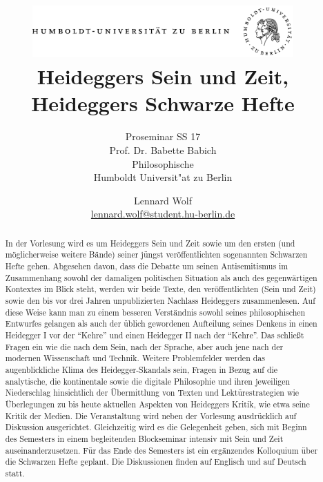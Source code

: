 \documentclass[emulatestandardclasses]{scrartcl}
\date{\vspace{-3ex}}
\begin{document}
\title{
	\includegraphics*[width=0.75\textwidth]{ErstesSem/images/hu_logo.png}\\
	\vspace{24pt}
	Heideggers Sein und Zeit, Heideggers Schwarze Hefte}
\subtitle{Proseminar SS 17\\
          Prof. Dr. Babette Babich\\
          Philosophische  \\ 
          Humboldt Universit"at zu Berlin}
\author{Lennard Wolf\\
        \small{\href{mailto:lennard.wolf@student.hu-berlin.de}{lennard.wolf@student.hu-berlin.de}}}
\maketitle
\begin{abstract}

In der Vorlesung wird es um Heideggers Sein und Zeit sowie um den ersten (und möglicherweise weitere Bände) seiner jüngst veröffentlichten sogenannten Schwarzen Hefte gehen. Abgesehen davon, dass die Debatte um seinen Antisemitismus im Zusammenhang sowohl der damaligen politischen Situation als auch des gegenwärtigen Kontextes im Blick steht, werden wir beide Texte, den veröffentlichten (Sein und Zeit) sowie den bis vor drei Jahren unpublizierten Nachlass Heideggers zusammenlesen. Auf diese Weise kann man zu einem besseren Verständnis sowohl seines philosophischen Entwurfes gelangen als auch der üblich gewordenen Aufteilung seines Denkens in einen Heidegger I vor der “Kehre” und einen Heidegger II nach der “Kehre”. Das schließt Fragen ein wie die nach dem Sein, nach der Sprache, aber auch jene nach der modernen Wissenschaft und Technik. Weitere Problemfelder werden das augenblickliche Klima des Heidegger-Skandals sein, Fragen in Bezug auf die analytische, die kontinentale sowie die digitale Philosophie und ihren jeweiligen Niederschlag hinsichtlich der Übermittlung von Texten und Lektürestrategien wie Überlegungen zu bis heute aktuellen Aspekten von Heideggers Kritik, wie etwa seine Kritik der Medien.
Die Veranstaltung wird neben der Vorlesung ausdrücklich auf Diskussion ausgerichtet. Gleichzeitig wird es die Gelegenheit geben, sich mit Beginn des Semesters in einem begleitenden Blockseminar intensiv mit Sein und Zeit auseinanderzusetzen. Für das Ende des Semesters ist ein ergänzendes Kolloquium über die Schwarzen Hefte geplant. Die Diskussionen finden auf Englisch und auf Deutsch statt.
\end{abstract}
\newpage
\end{document}
